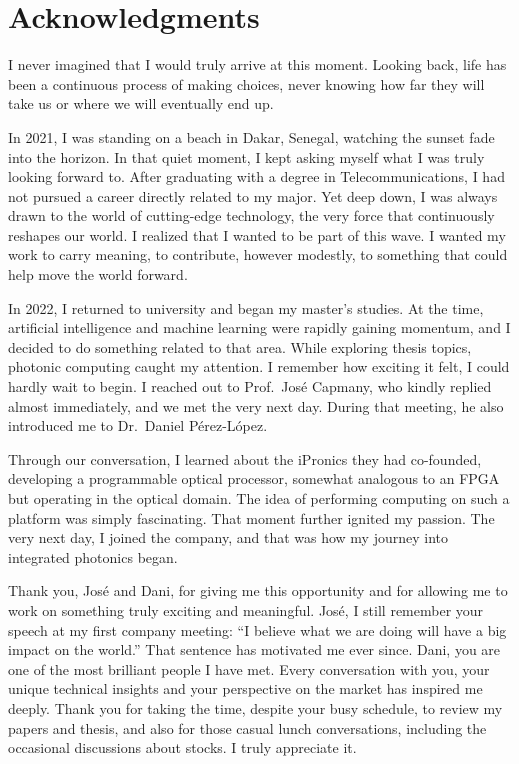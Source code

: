 

\chapter*{Acknowledgments}
I never imagined that I would truly arrive at this moment. Looking back, life has been a continuous process of making choices, never knowing how far they will take us or where we will eventually end up.

In 2021, I was standing on a beach in Dakar, Senegal, watching the sunset fade into the horizon.
In that quiet moment, I kept asking myself what I was truly looking forward to.
After graduating with a degree in Telecommunications, I had not pursued a career directly related to my major.
Yet deep down, I was always drawn to the world of cutting-edge technology,
the very force that continuously reshapes our world.
I realized that I wanted to be part of this wave.
I wanted my work to carry meaning, to contribute, however modestly, to something that could help move the world forward.

In 2022, I returned to university and began my master’s studies.
At the time, artificial intelligence and machine learning were rapidly gaining momentum, and I decided to do something related to that area.
While exploring thesis topics, photonic computing caught my attention.
I remember how exciting it felt, I could hardly wait to begin.
I reached out to Prof.~José Capmany, who kindly replied almost immediately, and we met the very next day.
During that meeting, he also introduced me to Dr.~Daniel Pérez-López.

Through our conversation, I learned about the iPronics they had co-founded, developing a programmable optical processor, somewhat analogous to an FPGA but operating in the optical domain.
The idea of performing computing on such a platform was simply fascinating.
That moment further ignited my passion.
The very next day, I joined the company, and that was how my journey into integrated photonics began.

Thank you, José and Dani, for giving me this opportunity and for allowing me to work on something truly exciting and meaningful.
José, I still remember your speech at my first company meeting: “I believe what we are doing will have a big impact on the world.” That sentence has motivated me ever since.
Dani, you are one of the most brilliant people I have met.
Every conversation with you, your unique technical insights and your perspective on the market has inspired me deeply.
Thank you for taking the time, despite your busy schedule, to review my papers and thesis, and also for those casual lunch conversations, including the occasional discussions about stocks. I truly appreciate it.

